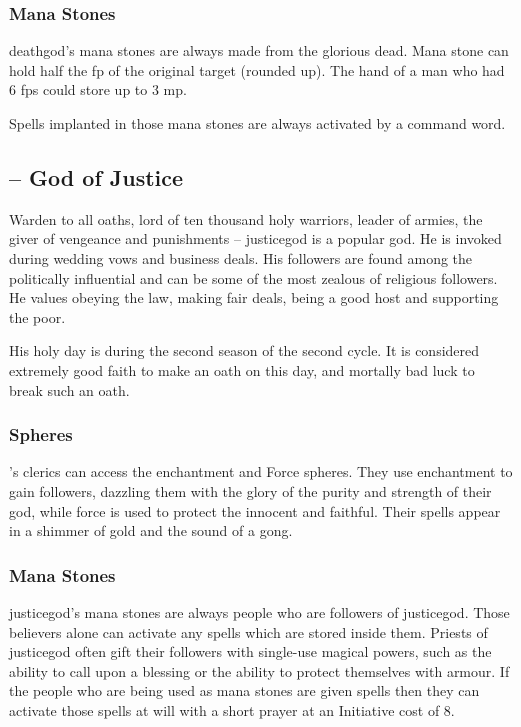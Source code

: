\begin{multicols}{2}
\subsubsection{Mana Stones}

\Gls{deathgod}'s mana stones are always made from the glorious dead.
Mana stone can hold half the \gls{fp} of the original target (rounded up).
The hand of a man who had 6 \glspl{fp} could store up to 3 \gls{mp}.

Spells implanted in those mana stones are always activated by a command word.

\subsection{ -- God of Justice}

\noindent Warden to all oaths, lord of ten thousand holy warriors, leader of armies, the giver of vengeance and punishments -- \gls{justicegod} is a popular god.
He is invoked during wedding vows and business deals.
His followers are found among the politically influential and can be some of the most zealous of religious followers.
He values obeying the law, making fair deals, being a good host and supporting the poor.

His holy day is during the second season of the second cycle.
It is considered extremely good faith to make an oath on this day, and mortally bad luck to break such an oath.

\subsubsection{Spheres}

\noindent {}'s clerics can access the enchantment and Force spheres.
They use enchantment to gain followers, dazzling them with the glory of the purity and strength of their god, while force is used to protect the innocent and faithful.
Their spells appear in a shimmer of gold and the sound of a gong.

\subsubsection{Mana Stones}

\Gls{justicegod}'s mana stones are always people who are followers of \Gls{justicegod}.
Those believers alone can activate any spells which are stored inside them.
Priests of \Gls{justicegod} often gift their followers with single-use magical powers, such as the ability to call upon a blessing or the ability to protect themselves with armour.
If the people who are being used as mana stones are given spells then they can activate those spells at will with a short prayer at an Initiative cost of 8.


\end{multicols}
